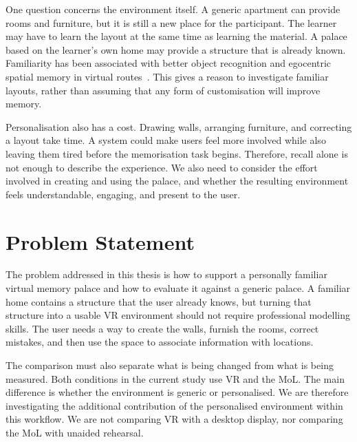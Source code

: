 One question concerns the environment itself. A generic apartment can provide rooms and furniture, but it is still a new place for the participant. The learner may have to learn the layout at the same time as learning the material. A palace based on the learner's own home may provide a structure that is already known. Familiarity has been associated with better object recognition and egocentric spatial memory in virtual routes~\cite{merriman2016}. This gives a reason to investigate familiar layouts, rather than assuming that any form of customisation will improve memory.

Personalisation also has a cost. Drawing walls, arranging furniture, and correcting a layout take time. A system could make users feel more involved while also leaving them tired before the memorisation task begins. Therefore, recall alone is not enough to describe the experience. We also need to consider the effort involved in creating and using the palace, and whether the resulting environment feels understandable, engaging, and present to the user.

\section{Problem Statement}
The problem addressed in this thesis is how to support a personally familiar virtual memory palace and how to evaluate it against a generic palace. A familiar home contains a structure that the user already knows, but turning that structure into a usable VR environment should not require professional modelling skills. The user needs a way to create the walls, furnish the rooms, correct mistakes, and then use the space to associate information with locations.

The comparison must also separate what is being changed from what is being measured. Both conditions in the current study use VR and the MoL. The main difference is whether the environment is generic or personalised. We are therefore investigating the additional contribution of the personalised environment within this workflow. We are not comparing VR with a desktop display, nor comparing the MoL with unaided rehearsal.

